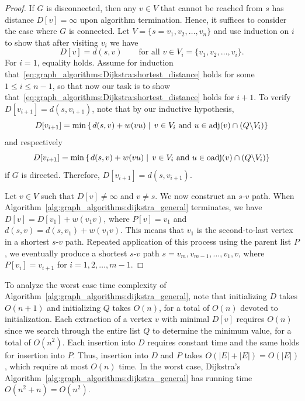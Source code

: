 \begin{proof}
If $G$ is disconnected, then any $v \in V$ that cannot be reached from
$s$ has distance $D[v] = \infty$ upon algorithm termination. Hence, it
suffices to consider the case where $G$ is connected. Let
$V = \{s=v_1, v_2, \dots, v_n\}$ and use induction on $i$ to show that
after visiting $v_i$ we have
%
\begin{equation}
\label{eq:graph_algorithms:Dijkstra:shortest_distance}
D[v]
=
d(s,v)
\qquad
\text{for all $v \in V_i = \{v_1, v_2, \dots, v_i\}$}.
\end{equation}
%
For $i = 1$, equality holds. Assume for induction
that~\eqref{eq:graph_algorithms:Dijkstra:shortest_distance} holds for
some $1 \leq i \leq n - 1$, so that now our task is to show
that~\eqref{eq:graph_algorithms:Dijkstra:shortest_distance} holds for
$i + 1$. To verify $D[v_{i+1}] = d(s, v_{i+1})$, note that by our
inductive hypothesis,
\[
D[v_{i+1}]
=
\min \left\{
\left. d(s,v) + w(vu) \;\right|\;
v \in V_i \text{ and } u \in \operatorname*{adj}(v) \cap (Q \backslash V_i)
\right\}
\]
and respectively
\[
D[v_{i+1}]
=
\min \left\{
\left. d(s,v) + w(vu) \;\right|\;
v \in V_i \text{ and } u \in \operatorname*{oadj}(v) \cap (Q \backslash V_i)
\right\}
\]
if $G$ is directed. Therefore, $D[v_{i+1}] = d(s, v_{i+1})$.

Let $v \in V$ such that $D[v] \neq \infty$ and $v \neq s$. We now
construct an $s$-$v$ path. When
Algorithm~\ref{alg:graph_algorithms:dijkstra_general} terminates, we
have $D[v] = D[v_1] + w(v_1 v)$, where $P[v] = v_1$ and
$d(s,v) = d(s, v_1) + w(v_1 v)$. This means that $v_1$ is the
second-to-last vertex in a shortest $s$-$v$ path. Repeated application
of this process using the parent list $P$, we eventually produce a
shortest $s$-$v$ path $s=v_m, v_{m-1}, \dots, v_1, v$, where
$P[v_i] = v_{i+1}$ for $i = 1, 2, \dots, m - 1$.
\end{proof}

To analyze the worst case time complexity of
Algorithm~\ref{alg:graph_algorithms:dijkstra_general}, note that
initializing $D$ takes $O(n + 1)$ and initializing $Q$ takes $O(n)$,
for a total of $O(n)$ devoted to initialization. Each extraction of a
vertex $v$ with minimal $D[v]$ requires $O(n)$ since we search through
the entire list $Q$ to determine the minimum value, for a total of
$O(n^2)$. Each insertion into $D$ requires constant time and the same
holds for insertion into $P$. Thus, insertion into $D$ and $P$ takes
$O(|E| + |E|) = O(|E|)$, which require at most $O(n)$ time. In the
worst case, Dijkstra's
Algorithm~\ref{alg:graph_algorithms:dijkstra_general} has running time
$O(n^2 + n) = O(n^2)$.


